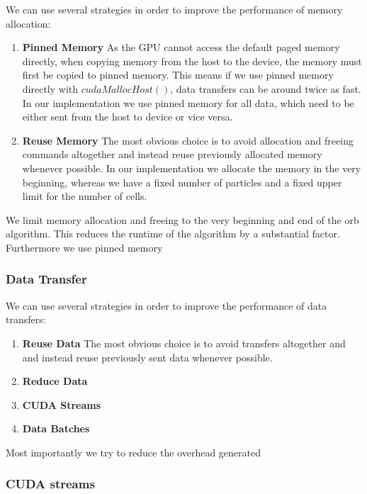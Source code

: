 \documentclass[]{article}
\begin{document}
We can use several strategies in order to improve the performance of memory allocation: 

\begin{enumerate}
	\item \textbf{Pinned Memory} As the GPU cannot access the default paged memory directly, when copying memory from the host to the device, the memory must first be copied to pinned memory. This means if we use pinned memory directly with $cudaMallocHost()$, data transfers can be around twice as fast. In our implementation we use pinned memory for all data, which need to be either sent from the host to device or vice versa.
	\item \textbf{Reuse Memory} The most obvious choice is to avoid allocation and freeing commands altogether and instead reuse previously allocated memory whenever possible. In our implementation we allocate the memory in the very beginning, whereas we have a fixed number of particles and a fixed upper limit for the number of cells. 
	
\end{enumerate}

We limit memory allocation and freeing to the very beginning and end of the orb algorithm. This reduces the runtime of the algorithm by a substantial factor. Furthermore we use pinned memory

\subsubsection{Data Transfer}

We can use several strategies in order to improve the performance of data transfers: 

\begin{enumerate}
	\item \textbf{Reuse Data} The most obvious choice is to avoid transfers altogether and and instead reuse previously sent data whenever possible. 
	\item \textbf{Reduce Data} 
	\item \textbf{CUDA Streams} 
	\item \textbf{Data Batches}
	
\end{enumerate}

Most importantly we try to reduce the overhead generated 

\subsubsection{CUDA streams}
\end{document}
